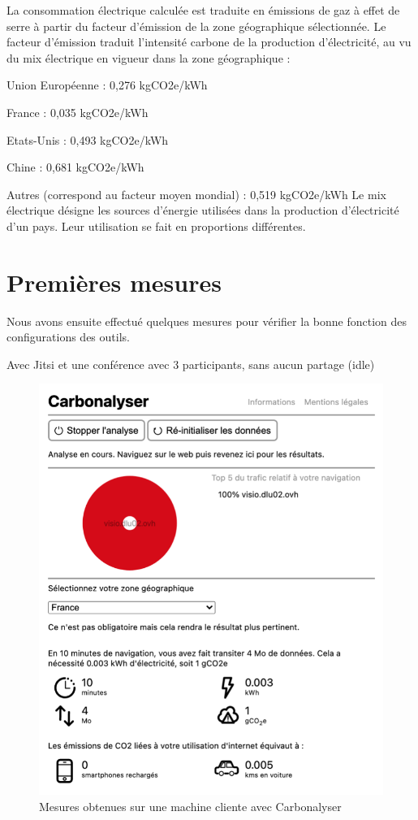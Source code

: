 \documentclass[11pt,a4paper]{article}
\begin{document}
La consommation électrique calculée est traduite en émissions de gaz à effet de serre à partir du facteur d’émission de la zone géographique sélectionnée. Le facteur d’émission traduit l’intensité carbone de la production d’électricité, au vu du mix électrique en vigueur dans la zone géographique :
\bi \item Union Européenne : 0,276 kgCO2e/kWh
\item France : 0,035 kgCO2e/kWh
\item Etats-Unis : 0,493 kgCO2e/kWh
\item Chine : 0,681 kgCO2e/kWh
\item Autres (correspond au facteur moyen mondial) : 0,519 kgCO2e/kWh \ei
{} Le mix électrique désigne les sources d’énergie utilisées dans la production d’électricité d’un pays. Leur utilisation se fait en proportions différentes. \eb

\section{Premières mesures}
Nous avons ensuite effectué quelques mesures pour vérifier la bonne fonction des configurations des outils.

Avec Jitsi et une conférence avec 3 participants, sans aucun partage (idle)
\begin{figure}[!h]
\centering \includegraphics[scale=0.6]{mesure-jitsi-off.png}
\caption{Mesures obtenues sur une machine cliente avec Carbonalyser}
\end{figure}
\end{document}
